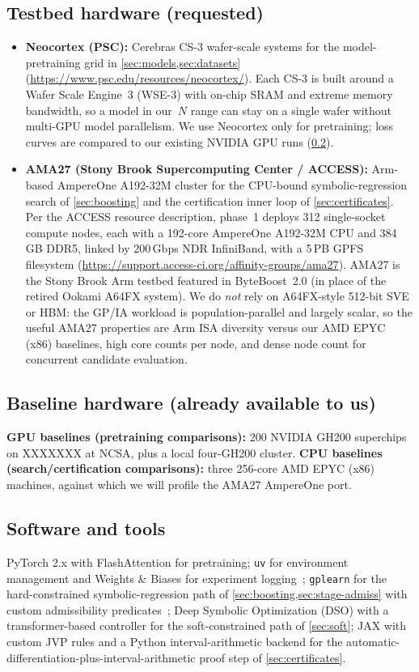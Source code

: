 \documentclass[11pt]{article}
\begin{document}
\subsection{Testbed hardware (requested)}\label{sec:testbeds}
\begin{itemize}[nosep, leftmargin=1.4em]
 \item \textbf{Neocortex (PSC):} Cerebras CS-3 wafer-scale systems for the model-pretraining grid in \cref{sec:models,sec:datasets}
 (\url{https://www.psc.edu/resources/neocortex/}).
 Each CS-3 is built around a Wafer Scale Engine~3 (WSE-3) with on-chip SRAM and extreme memory bandwidth, so a model in our~$N$ range can stay on a single wafer without multi-GPU model parallelism.
 We use Neocortex only for pretraining; loss curves are compared to our existing NVIDIA GPU runs (\cref{sec:baselines}).
 \item \textbf{AMA27 (Stony Brook Supercomputing Center / ACCESS):} Arm-based AmpereOne A192-32M cluster for the CPU-bound symbolic-regression search of \cref{sec:boosting} and the certification inner loop of \cref{sec:certificates}.
 Per the ACCESS resource description, phase~1 deploys 312 single-socket compute nodes, each with a 192-core AmpereOne A192-32M CPU and 384\,GB DDR5, linked by 200\,Gbps NDR InfiniBand, with a 5\,PB GPFS filesystem (\url{https://support.access-ci.org/affinity-groups/ama27}).
 AMA27 is the Stony Brook Arm testbed featured in ByteBoost~2.0 (in place of the retired Ookami A64FX system).
 We do \emph{not} rely on A64FX-style 512-bit SVE or HBM: the GP/IA workload is population-parallel and largely scalar, so the useful AMA27 properties are Arm ISA diversity versus our AMD EPYC (x86) baselines, high core counts per node, and dense node count for concurrent candidate evaluation.
\end{itemize}

\subsection{Baseline hardware (already available to us)}\label{sec:baselines}
\textbf{GPU baselines (pretraining comparisons):} 200 NVIDIA GH200 superchips on XXXXXXX at NCSA, plus a local four-GH200 cluster.
\textbf{CPU baselines (search/certification comparisons):} three 256-core AMD EPYC (x86) machines, against which we will profile the AMA27 AmpereOne port.

\subsection{Software and tools}\label{sec:software}
PyTorch 2.x with FlashAttention for pretraining; \texttt{uv} for environment management and Weights \& Biases for experiment logging~\citep{biewald2020wandb}; \texttt{gplearn} for the hard-constrained symbolic-regression path of \cref{sec:boosting,sec:stage-admiss} with custom admissibility predicates~\citep{stephens2015gplearn}; Deep Symbolic Optimization (DSO) with a transformer-based controller for the soft-constrained path of \cref{sec:soft}; JAX with custom JVP rules and a Python interval-arithmetic backend for the automatic-differentiation-plus-interval-arithmetic proof step of \cref{sec:certificates}.
\end{document}
